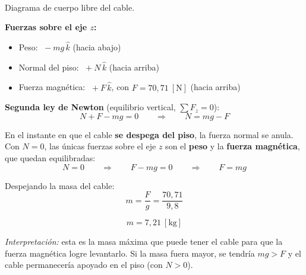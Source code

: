 \documentclass[12pt,letterpaper]{article}
\begin{document}
\noindent
\begin{minipage}[t]{0.34\textwidth}
\centering
\vspace{0pt}
\\[3pt]
{\footnotesize Diagrama de cuerpo libre del cable.}
\end{minipage}%
\hfill
\begin{minipage}[t]{0.62\textwidth}
\vspace{0pt}
\textbf{Fuerzas sobre el eje $z$:}
\begin{itemize}\setlength\itemsep{2pt}
    \item Peso: $\;-mg\,\hat{k}$ \hfill (hacia abajo)
    \item Normal del piso: $\;+N\,\hat{k}$ \hfill (hacia arriba)
    \item Fuerza magn\'etica: $\;+F\,\hat{k}$, \; con $F = 70{,}71\ [\text{N}]$ \hfill (hacia arriba)
\end{itemize}

\smallskip
\textbf{Segunda ley de Newton} (equilibrio vertical, $\sum F_z = 0$):
\[
    N + F - mg = 0
    \qquad\Longrightarrow\qquad
    N = mg - F
\]
\end{minipage}

\bigskip

\noindent En el instante en que el cable \textbf{se despega del piso}, la fuerza normal se anula.
Con $N = 0$, las \'unicas fuerzas sobre el eje $z$ son el \textbf{peso} y la \textbf{fuerza
magn\'etica}, que quedan equilibradas:
\[
    N = 0
    \qquad\Longrightarrow\qquad
    F - mg = 0
    \qquad\Longrightarrow\qquad
    F = mg
\]

\noindent Despejando la masa del cable:
\[
    m = \frac{F}{g} = \frac{70{,}71}{9{,}8}
\]

\[
    \boxed{m = 7{,}21\ [\text{kg}]}
\]

\noindent\small\textit{Interpretaci\'on:} esta es la masa m\'axima que puede tener el cable para
que la fuerza magn\'etica logre levantarlo. Si la masa fuera mayor, se tendr\'ia $mg > F$ y el
cable permanecer\'ia apoyado en el piso (con $N > 0$).
\normalsize
\end{document}
